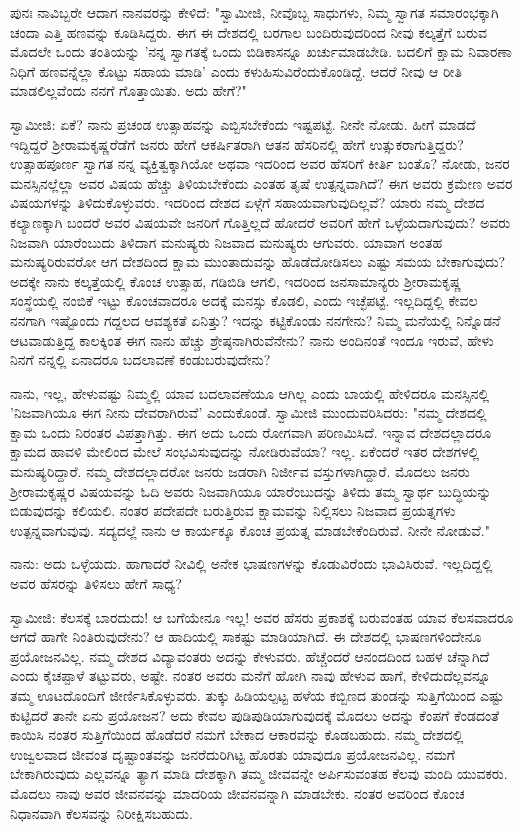 ಪುನಃ ನಾವಿಬ್ಬರೇ ಆದಾಗ ನಾನವರನ್ನು ಕೇಳಿದೆ: "ಸ್ವಾಮೀಜಿ, ನೀವೊಬ್ಬ ಸಾಧುಗಳು, ನಿಮ್ಮ ಸ್ವಾಗತ ಸಮಾರಂಭಕ್ಕಾಗಿ ಚಂದಾ ಎತ್ತಿ ಹಣವನ್ನು ಕೂಡಿಸಿದ್ದರು. ಈಗ ಈ ದೇಶದಲ್ಲಿ ಬರಗಾಲ ಬಂದಿರುವುದರಿಂದ ನೀವು ಕಲ್ಕತ್ತೆಗೆ ಬರುವ ಮೊದಲೇ ಒಂದು ತಂತಿಯನ್ನು 'ನನ್ನ ಸ್ವಾಗತಕ್ಕೆ ಒಂದು ಬಿಡಿಕಾಸನ್ನೂ ಖರ್ಚುಮಾಡಬೇಡಿ. ಬದಲಿಗೆ ಕ್ಷಾಮ ನಿವಾರಣಾ ನಿಧಿಗೆ ಹಣವನ್ನೆಲ್ಲಾ ಕೊಟ್ಟು ಸಹಾಯ ಮಾಡಿ' ಎಂದು ಕಳುಹಿಸುವಿರೆಂದುಕೊಂಡಿದ್ದೆ. ಆದರೆ ನೀವು ಆ ರೀತಿ ಮಾಡಲಿಲ್ಲವೆಂದು ನನಗೆ ಗೊತ್ತಾಯಿತು. ಅದು ಹೇಗೆ?"

ಸ್ವಾಮೀಜಿ: ಏಕೆ? ನಾನು ಪ್ರಚಂಡ ಉತ್ಸಾಹವನ್ನು ಎಬ್ಬಿಸಬೇಕೆಂದು ಇಷ್ಟಪಟ್ಟೆ. ನೀನೇ ನೋಡು. ಹೀಗೆ ಮಾಡದೆ ಇದ್ದಿದ್ದರೆ ಶ‍್ರೀರಾಮಕೃಷ್ಣರೆಡೆಗೆ ಜನರು ಹೇಗೆ ಆಕರ್ಷಿತರಾಗಿ ಆತನ ಹೆಸರಿನಲ್ಲಿ ಹೇಗೆ ಉತ್ಸುಕರಾಗುತ್ತಿದ್ದರು? ಉತ್ಸಾಹಪೂರ್ಣ ಸ್ವಾಗತ ನನ್ನ ವ್ಯಕ್ತಿತ್ವಕ್ಕಾಗಿಯೋ ಅಥವಾ ಇದರಿಂದ ಅವರ ಹೆಸರಿಗೆ ಕೀರ್ತಿ ಬಂತೊ? ನೋಡು, ಜನರ ಮನಸ್ಸಿನಲ್ಲೆಲ್ಲಾ ಅವರ ವಿಷಯ ಹೆಚ್ಚು ತಿಳಿಯಬೇಕೆಂದು ಎಂತಹ ತೃಷೆ ಉತ್ಪನ್ನವಾಗಿದೆ? ಈಗ ಅವರು ಕ್ರಮೇಣ ಅವರ ವಿಷಯಗಳನ್ನು ತಿಳಿದುಕೊಳ್ಳುವರು. ಇದರಿಂದ ದೇಶದ ಏಳ್ಗೆಗೆ ಸಹಾಯವಾಗುವುದಿಲ್ಲವೆ? ಯಾರು ನಮ್ಮ ದೇಶದ ಕಲ್ಯಾಣಕ್ಕಾಗಿ ಬಂದರೆ ಅವರ ವಿಷಯವೇ ಜನರಿಗೆ ಗೊತ್ತಿಲ್ಲದೆ ಹೋದರೆ ಅವರಿಗೆ ಹೇಗೆ ಒಳ್ಳೆಯದಾಗುವುದು? ಅವರು ನಿಜವಾಗಿ ಯಾರೆಂಬುದು ತಿಳಿದಾಗ ಮನುಷ್ಯರು ನಿಜವಾದ ಮನುಷ್ಯರು ಆಗುವರು. ಯಾವಾಗ ಅಂತಹ ಮನುಷ್ಯರಿರುವರೋ ಆಗ ದೇಶದಿಂದ ಕ್ಷಾಮ ಮುಂತಾದುವನ್ನು ಹೊಡೆದೋಡಿಸಲು ಎಷ್ಟು ಸಮಯ ಬೇಕಾಗುವುದು? ಅದಕ್ಕೇ ನಾನು ಕಲ್ಕತ್ತೆಯಲ್ಲಿ ಕೊಂಚ ಉತ್ಸಾಹ, ಗಡಿಬಿಡಿ ಆಗಲಿ, ಇದರಿಂದ ಜನಸಾಮಾನ್ಯರು ಶ‍್ರೀರಾಮಕೃಷ್ಣ ಸಂಸ್ಥೆಯಲ್ಲಿ ನಂಬಿಕೆ ಇಟ್ಟು ಕೊಂಚವಾದರೂ ಅದಕ್ಕೆ ಮನಸ್ಸು ಕೊಡಲಿ, ಎಂದು ಇಚ್ಛೆಪಟ್ಟೆ. ಇಲ್ಲದಿದ್ದಲ್ಲಿ ಕೇವಲ ನನಗಾಗಿ ಇಷ್ಟೊಂದು ಗದ್ದಲದ ಆವಶ್ಯಕತೆ ಏನಿತ್ತು? ಇದನ್ನು ಕಟ್ಟಿಕೊಂಡು ನನಗೇನು? ನಿಮ್ಮ ಮನೆಯಲ್ಲಿ ನಿನ್ನೊಡನೆ ಆಟವಾಡುತ್ತಿದ್ದ ಕಾಲಕ್ಕಿಂತ ಈಗ ನಾನು ಹೆಚ್ಚು ಶ್ರೇಷ್ಠನಾಗಿರುವೆನೇನು? ನಾನು ಅಂದಿನಂತೆ ಇಂದೂ ಇರುವೆ, ಹೇಳು ನಿನಗೆ ನನ್ನಲ್ಲಿ ಏನಾದರೂ ಬದಲಾವಣೆ ಕಂಡುಬರುವುದೇನು?

ನಾನು, ಇಲ್ಲ, ಹೇಳುವಷ್ಟು ನಿಮ್ಮಲ್ಲಿ ಯಾವ ಬದಲಾವಣೆಯೂ ಆಗಿಲ್ಲ ಎಂದು ಬಾಯಲ್ಲಿ ಹೇಳಿದರೂ ಮನಸ್ಸಿನಲ್ಲಿ 'ನಿಜವಾಗಿಯೂ ಈಗ ನೀನು ದೇವರಾಗಿರುವೆ' ಎಂದುಕೊಂಡೆ. ಸ್ವಾಮೀಜಿ ಮುಂದುವರಿಸಿದರು: "ನಮ್ಮ ದೇಶದಲ್ಲಿ ಕ್ಷಾಮ ಒಂದು ನಿರಂತರ ವಿಪತ್ತಾಗಿತ್ತು. ಈಗ ಅದು ಒಂದು ರೋಗವಾಗಿ ಪರಿಣಮಿಸಿದೆ. ಇನ್ನಾವ ದೇಶದಲ್ಲಾದರೂ ಕ್ಷಾಮದ ಹಾವಳಿ ಮೇಲಿಂದ ಮೇಲೆ ಸಂಭವಿಸುವುದನ್ನು ನೋಡಿರುವೆಯಾ? ಇಲ್ಲ. ಏಕೆಂದರೆ ಇತರ ದೇಶಗಳಲ್ಲಿ ಮನುಷ್ಯರಿದ್ದಾರೆ. ನಮ್ಮ ದೇಶದಲ್ಲಾದರೋ ಜನರು ಜಡರಾಗಿ ನಿರ್ಜೀವ ವಸ್ತುಗಳಾಗಿದ್ದಾರೆ. ಮೊದಲು ಜನರು ಶ‍್ರೀರಾಮಕೃಷ್ಣರ ವಿಷಯವನ್ನು ಓದಿ ಅವರು ನಿಜವಾಗಿಯೂ ಯಾರೆಂಬುದನ್ನು ತಿಳಿದು ತಮ್ಮ ಸ್ವಾರ್ಥ ಬುದ್ಧಿಯನ್ನು ಬಿಡುವುದನ್ನು ಕಲಿಯಲಿ. ನಂತರ ಪದೇಪದೇ ಬರುತ್ತಿರುವ ಕ್ಷಾಮವನ್ನು ನಿಲ್ಲಿಸಲು ನಿಜವಾದ ಪ್ರಯತ್ನಗಳು ಉತ್ಪನ್ನವಾಗುವುವು. ಸದ್ಯದಲ್ಲೆ ನಾನು ಆ ಕಾರ್ಯಕ್ಕೂ ಕೊಂಚ ಪ್ರಯತ್ನ ಮಾಡಬೇಕೆಂದಿರುವೆ. ನೀನೇ ನೋಡುವೆ."

ನಾನು: ಅದು ಒಳ್ಳೆಯದು. ಹಾಗಾದರೆ ನೀವಿಲ್ಲಿ ಅನೇಕ ಭಾಷಣಗಳನ್ನು ಕೊಡುವಿರೆಂದು ಭಾವಿಸಿರುವೆ. ಇಲ್ಲದಿದ್ದಲ್ಲಿ ಅವರ ಹೆಸರನ್ನು ತಿಳಿಸಲು ಹೇಗೆ ಸಾಧ್ಯ?

ಸ್ವಾಮೀಜಿ: ಕೆಲಸಕ್ಕೆ ಬಾರದುದು! ಆ ಬಗೆಯೇನೂ ಇಲ್ಲ! ಅವರ ಹೆಸರು ಪ್ರಕಾಶಕ್ಕೆ ಬರುವಂತಹ ಯಾವ ಕೆಲಸವಾದರೂ ಆಗದೆ ಹಾಗೇ ನಿಂತಿರುವುದೇನು? ಆ ಹಾದಿಯಲ್ಲಿ ಸಾಕಷ್ಟು ಮಾಡಿಯಾಗಿದೆ. ಈ ದೇಶದಲ್ಲಿ ಭಾಷಣಗಳಿಂದೇನೂ ಪ್ರಯೋಜನವಿಲ್ಲ. ನಮ್ಮ ದೇಶದ ವಿದ್ಯಾವಂತರು ಅದನ್ನು ಕೇಳುವರು. ಹೆಚ್ಚೆಂದರೆ ಆನಂದದಿಂದ ಬಹಳ ಚೆನ್ನಾಗಿದೆ ಎಂದು ಕೈಚಪ್ಪಾಳೆ ತಟ್ಟುವರು, ಅಷ್ಟೇ. ನಂತರ ಅವರು ಮನೆಗೆ ಹೋಗಿ ನಾವು ಹೇಳುವ ಹಾಗೆ, ಕೇಳಿದುದೆಲ್ಲವನ್ನೂ ತಮ್ಮ ಊಟದೊಂದಿಗೆ ಜೀರ್ಣಿಸಿಕೊಳ್ಳುವರು. ತುಕ್ಕು ಹಿಡಿಯಲ್ಪಟ್ಟ ಹಳೆಯ ಕಬ್ಬಿಣದ ತುಂಡನ್ನು ಸುತ್ತಿಗೆಯಿಂದ ಎಷ್ಟು ಕುಟ್ಟಿದರೆ ತಾನೇ ಏನು ಪ್ರಯೋಜನ? ಅದು ಕೇವಲ ಪುಡಿಪುಡಿಯಾಗುವುದಕ್ಕೆ ಮೊದಲು ಅದನ್ನು ಕೆಂಪಗೆ ಕೆಂಡದಂತೆ ಕಾಯಿಸಿ ನಂತರ ಸುತ್ತಿಗೆಯಿಂದ ಹೊಡೆದರೆ ನಮಗೆ ಬೇಕಾದ ಆಕಾರವನ್ನು ಕೊಡಬಹುದು. ನಮ್ಮ ದೇಶದಲ್ಲಿ ಉಜ್ವಲವಾದ ಜೀವಂತ ದೃಷ್ಟಾಂತವನ್ನು ಜನರೆದುರಿಗಿಟ್ಟ ಹೊರತು ಯಾವುದೂ ಪ್ರಯೋಜನವಿಲ್ಲ. ನಮಗೆ ಬೇಕಾಗಿರುವುದು ಎಲ್ಲವನ್ನೂ ತ್ಯಾಗ ಮಾಡಿ ದೇಶಕ್ಕಾಗಿ ತಮ್ಮ ಜೀವವನ್ನೇ ಅರ್ಪಿಸುವಂತಹ ಕೆಲವು ಮಂದಿ ಯುವಕರು. ಮೊದಲು ನಾವು ಅವರ ಜೀವನವನ್ನು ಮಾದರಿಯ ಜೀವನವನ್ನಾಗಿ ಮಾಡಬೇಕು. ನಂತರ ಅವರಿಂದ ಕೊಂಚ ನಿಧಾನವಾಗಿ ಕೆಲಸವನ್ನು ನಿರೀಕ್ಷಿಸಬಹುದು.

